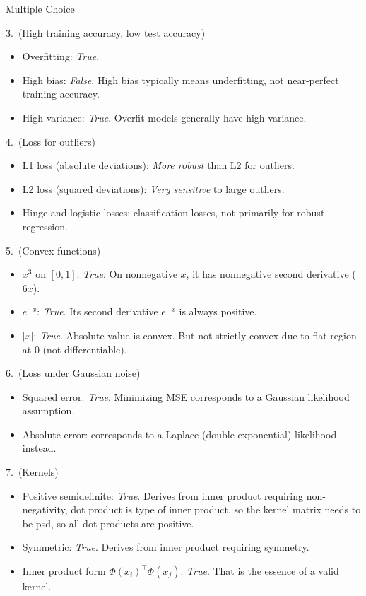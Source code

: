 \documentclass{article}
\begin{document}
\begin{exercise}{Multiple Choice}
\begin{solution}
    3.\ (High training accuracy, low test accuracy)
    \begin{itemize}
      \item Overfitting: \emph{True}.
      \item High bias: \emph{False}. High bias typically means underfitting, not near-perfect training accuracy.
      \item High variance: \emph{True}. Overfit models generally have high variance.
    \end{itemize}

    4.\ (Loss for outliers)
    \begin{itemize}
      \item L1 loss (absolute deviations): \emph{More robust} than L2 for outliers.
      \item L2 loss (squared deviations): \emph{Very sensitive} to large outliers.
      \item Hinge and logistic losses: classification losses, not primarily for robust regression.
    \end{itemize}

    5.\ (Convex functions)
    \begin{itemize}
      \item $x^3$ on $[0,1]$: \emph{True}. On nonnegative $x$, it has nonnegative second derivative ($6x$).
      \item $e^{-x}$: \emph{True}. Its second derivative $e^{-x}$ is always positive.
      \item $|x|$: \emph{True}. Absolute value is convex. But not strictly convex due to flat region at 0 (not differentiable).
    \end{itemize}

    6.\ (Loss under Gaussian noise)
    \begin{itemize}
      \item Squared error: \emph{True}. Minimizing MSE corresponds to a Gaussian likelihood assumption.
      \item Absolute error: corresponds to a Laplace (double-exponential) likelihood instead.
    \end{itemize}

    7.\ (Kernels)
    \begin{itemize}
      \item Positive semidefinite: \emph{True}. Derives from inner product requiring non-negativity, dot product is type of inner product, so the kernel matrix needs to be psd, so all dot products are positive.
      \item Symmetric: \emph{True}. Derives from inner product requiring symmetry.
      \item Inner product form $\Phi(x_i)^\top \Phi(x_j)$: \emph{True}. That is the essence of a valid kernel.
    \end{itemize}
  \end{solution}
\end{exercise}
\end{document}
